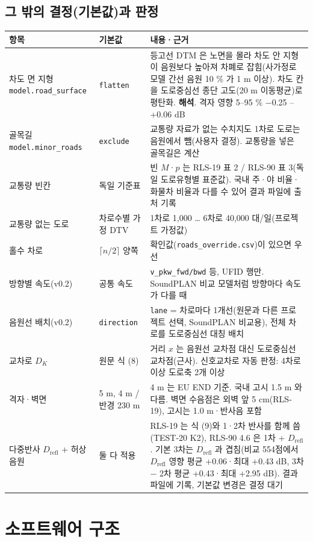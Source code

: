 \documentclass[10pt,a4paper]{article}
\newcommand{\f}[1]{\texttt{#1}}
\begin{document}
\subsection{그 밖의 결정(기본값)과 판정}
\begin{longtable}{P{40mm}P{30mm}P{86mm}}
\toprule 항목 & 기본값 & 내용·근거 \\ \midrule\endhead
차도 면 지형 \f{model.road\_surface} & \f{flatten} & 등고선 DTM 은 노면을 몰라 차도 안 지형이 음원보다 높아져 차폐로 잡힘(사가정로 모델 간선 음원 10 \% 가 1 m 이상). 차도 칸을 도로중심선 종단 고도(20 m 이동평균)로 평탄화. \textbf{해석}. 격자 영향 5–95 \% −0.25 – +0.06 dB \\
골목길 \f{model.minor\_roads} & \f{exclude} & 교통량 자료가 없는 수치지도 1차로 도로는 음원에서 뺌(사용자 결정). 교통량을 넣은 골목길은 계산 \\
교통량 빈칸 & 독일 기준표 & 빈 $M$·$p$ 는 RLS-19 표 2 / RLS-90 표 3(독일 도로유형별 표준값). 국내 주·야 비율·화물차 비율과 다를 수 있어 결과 파일에 출처 기록 \\
교통량 없는 도로 & 차로수별 가정 DTV & 1차로 1,000 … 6차로 40,000 대/일(프로젝트 가정값) \\
홀수 차로 & $\lceil n/2 \rceil$ 양쪽 & 확인값(\f{roads\_override.csv})이 있으면 우선 \\
방향별 속도(v0.2) & 공통 속도 & \f{v\_pkw\_fwd/bwd} 등, UFID 행만. SoundPLAN 비교 모델처럼 방향마다 속도가 다를 때 \\
음원선 배치(v0.2) & \f{direction} & \f{lane} = 차로마다 1개선(원문과 다른 프로젝트 선택, SoundPLAN 비교용), 전체 차로를 도로중심선 대칭 배치 \\
교차로 $D_K$ & 원문 식 (8) & 거리 $x$ 는 음원선 교차점 대신 도로중심선 교차점(근사). 신호교차로 자동 판정: 4차로 이상 도로축 2개 이상 \\
격자·벽면 & 5 m, 4 m / 반경 230 m & 4 m 는 EU END 기준. 국내 고시 1.5 m 와 다름. 벽면 수음점은 외벽 앞 5 cm(RLS-19), 고시는 1.0 m·반사음 포함 \\
다중반사 $D_\mathrm{refl}$ + 허상음원 & 둘 다 적용 & RLS-19 는 식 (9)와 1·2차 반사를 함께 씀(TEST-20 K2), RLS-90 4.6 은 1차 + $D_\mathrm{refl}$. 기본 3차는 $D_\mathrm{refl}$ 과 겹침(비교 554점에서 $D_\mathrm{refl}$ 영향 평균 +0.06·최대 +0.43 dB, 3차 − 2차 평균 +0.43·최대 +2.95 dB). 결과 파일에 기록, 기본값 변경은 결정 대기 \\
\bottomrule
\end{longtable}

\section{소프트웨어 구조}
\end{document}
